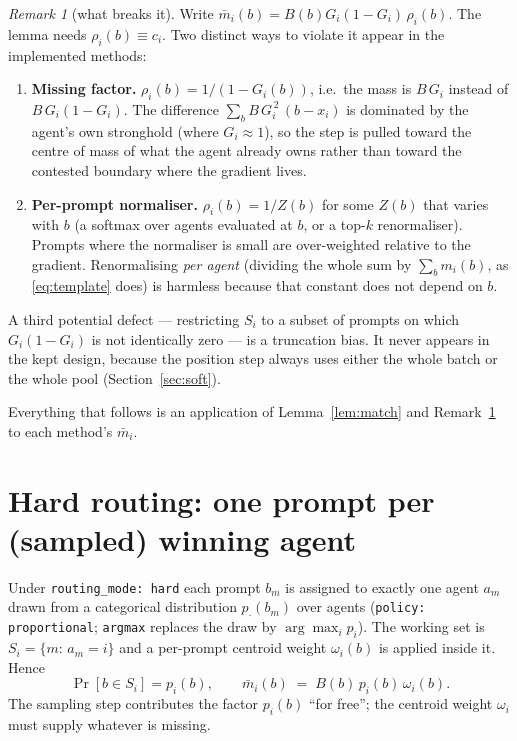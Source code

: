 \documentclass[11pt]{article}
\theoremstyle{remark}
\newtheorem{remark}{Remark}
\newcommand{\cfg}[1]{\texttt{#1}}
\begin{document}
\begin{remark}[what breaks it]
\label{rem:break}
Write $\bar m_i(b) = B(b)G_i(1-G_i)\,\rho_i(b)$. The lemma needs
$\rho_i(b)\equiv c_i$. Two distinct ways to violate it appear in the
implemented methods:
\begin{enumerate}
\item \textbf{Missing factor.} $\rho_i(b) = 1/(1-G_i(b))$, i.e.\ the mass is
  $B\,G_i$ instead of $B\,G_i(1-G_i)$. The difference
  $\sum_b B\,G_i^{\,2}\,(b-x_i)$ is dominated by the agent's own stronghold
  (where $G_i\approx1$), so the step is pulled toward the centre of mass of
  what the agent already owns rather than toward the contested boundary where
  the gradient lives.
\item \textbf{Per-prompt normaliser.} $\rho_i(b) = 1/Z(b)$ for some
  $Z(b)$ that varies with $b$ (a softmax over agents evaluated at $b$, or a
  top-$k$ renormaliser). Prompts where the normaliser is small are
  over-weighted relative to the gradient. Renormalising \emph{per agent}
  (dividing the whole sum by $\sum_b m_i(b)$, as \eqref{eq:template} does) is
  harmless because that constant does not depend on $b$.
\end{enumerate}
A third potential defect --- restricting $S_i$ to a subset of prompts on
which $G_i(1-G_i)$ is not identically zero --- is a truncation bias. It
never appears in the kept design, because the position step always uses
either the whole batch or the whole pool (Section~\ref{sec:soft}).
\end{remark}

Everything that follows is an application of Lemma~\ref{lem:match} and
Remark~\ref{rem:break} to each method's $\bar m_i$.

\section{Hard routing: one prompt per (sampled) winning agent}
\label{sec:hard}

Under \cfg{routing\_mode: hard} each prompt $b_m$ is assigned to exactly one
agent $a_m$ drawn from a categorical distribution $p_\cdot(b_m)$ over agents
(\cfg{policy: proportional}; \cfg{argmax} replaces the draw by
$\arg\max_i p_i$). The working set is $S_i=\{m:\,a_m=i\}$ and a per-prompt
centroid weight $\omega_i(b)$ is applied inside it. Hence
\begin{equation}
  \Pr[b\in S_i]=p_i(b),\qquad
  \bar m_i(b) \;=\; B(b)\,p_i(b)\,\omega_i(b).
  \label{eq:hardmass}
\end{equation}
The sampling step contributes the factor $p_i(b)$ ``for free''; the centroid
weight $\omega_i$ must supply whatever is missing.
\end{document}
